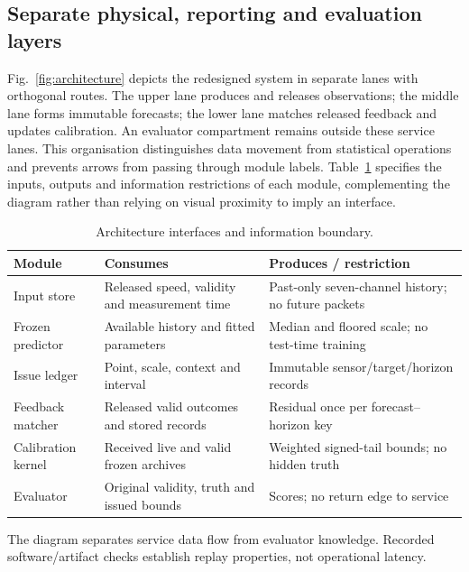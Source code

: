 \documentclass[pdflatex,sn-mathphys-num]{sn-jnl}
\begin{document}
\subsection{Separate physical, reporting and evaluation layers}
Fig.~\ref{fig:architecture} depicts the redesigned system in separate lanes with orthogonal routes. The upper lane produces and releases observations; the middle lane forms immutable forecasts; the lower lane matches released feedback and updates calibration. An evaluator compartment remains outside these service lanes. This organisation distinguishes data movement from statistical operations and prevents arrows from passing through module labels. Table~\ref{tab:architecture-contract} specifies the inputs, outputs and information restrictions of each module, complementing the diagram rather than relying on visual proximity to imply an interface.

\begin{table}[!htbp]\caption{Architecture interfaces and information boundary.}\label{tab:architecture-contract}\centering\setlength{\tabcolsep}{3pt}\small
\begin{tabular}{>{\raggedright\arraybackslash}p{}>{\raggedright\arraybackslash}p{}>{\raggedright\arraybackslash}p{}}\toprule
Module & Consumes & Produces / restriction \\\midrule
Input store & Released speed, validity and measurement time & Past-only seven-channel history; no future packets \\
Frozen predictor & Available history and fitted parameters & Median and floored scale; no test-time training \\
Issue ledger & Point, scale, context and interval & Immutable sensor/target/horizon records \\
Feedback matcher & Released valid outcomes and stored records & Residual once per forecast--horizon key \\
Calibration kernel & Received live and valid frozen archives & Weighted signed-tail bounds; no hidden truth \\
Evaluator & Original validity, truth and issued bounds & Scores; no return edge to service \\
\bottomrule\end{tabular}\par\smallskip\footnotesize The diagram separates service data flow from evaluator knowledge. Recorded software/artifact checks establish replay properties, not operational latency.\end{table}
\FloatBarrier
\end{document}
